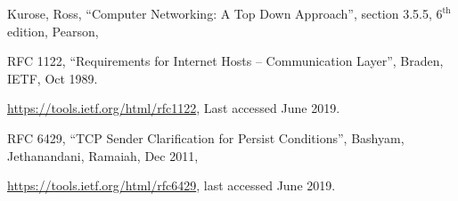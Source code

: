 \begin{multicols}{2}
\begin{thebibliography}{99}
 Kurose, Ross, “Computer Networking: A Top Down Approach”, section 3.5.5, $6^{\text{th}}$ edition, Pearson, 

RFC 1122, “Requirements for Internet Hosts -- Communication Layer”, Braden, IETF, Oct 1989. 

\url{https://tools.ietf.org/html/rfc1122}, Last accessed June 2019.

 RFC 6429, “TCP Sender Clarification for Persist Conditions”, Bashyam, Jethanandani, Ramaiah, Dec 2011, 

\url{https://tools.ietf.org/html/rfc6429}, last accessed June 2019.

\end{thebibliography}
\end{multicols}



